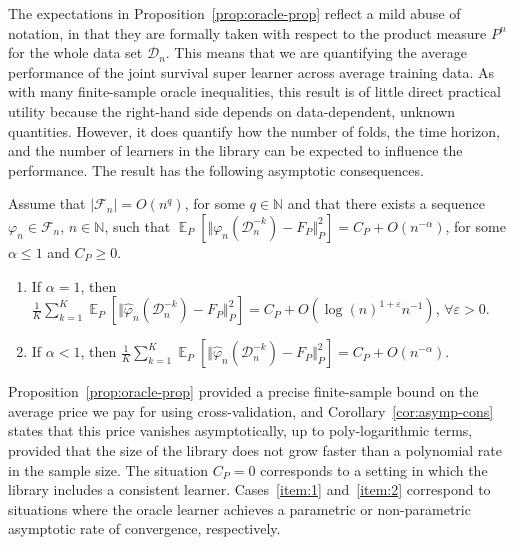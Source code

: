 \documentclass[lineno]{biometrika}
\DeclareMathOperator{\E}{\mathbb{E}} %
\newcommand{\N}{\mathbb{N}}
\renewcommand{\phi}{\varphi}
\renewcommand{\epsilon}{\varepsilon}
\newcommand\bigO{\textit{O}}
\newcommand{\1}{\mathds{1}}
\newcommand{\data}{\ensuremath{\mathcal{D}}}
\begin{document}
The expectations in Proposition~\ref{prop:oracle-prop} reflect a mild
abuse of notation, in that they are formally taken with respect to the
product measure \( P^{n} \) for the whole data set \( \data_n \). This
means that we are quantifying the average performance of the joint
survival super learner across average training data. As with many
finite-sample oracle inequalities, this result is of little direct
practical utility because the right-hand side depends on
data-dependent, unknown quantities. However, it does quantify how the
number of folds, the time horizon, and the number of learners in the
library can be expected to influence the performance. The result has
the following asymptotic consequences.

\begin{corollary}
  \label{cor:asymp-cons}
  Assume that \( |\mathcal{F}_n| = \bigO(n^q)\), for some
  \( q \in \N \) and that there exists a sequence
  \( \phi_n \in \mathcal{F}_n \), \( n \in \N \), such that
  \(  \E_{P}{\left[ \Vert
      \phi_n(\data_n^{-k}) - F_P \Vert_{P}^2 \right]} = C_P +
  \bigO(n^{-\alpha}) \), for some \( \alpha\leq 1 \) and
  \( C_P \geq 0 \).
  \begin{enumerate}[label=(\alph*)]
  \item\label{item:1} If $\alpha=1$, then
    \(\frac{1}{K}\sum_{k=1}^{K} \E_{P}{\left[ \Vert
        \hat{\phi}_n(\data_n^{-k}) - F_P \Vert_{P}^2 \right]} = C_P +
    \bigO(\log(n)^{1+\epsilon}n^{-1}) \), $\forall\epsilon>0$.
  \item\label{item:2} If $\alpha<1$, then
    \(\frac{1}{K}\sum_{k=1}^{K} \E_{P}{\left[ \Vert
        \hat{\phi}_n(\data_n^{-k}) - F_P \Vert_{P}^2 \right]} = C_P +
    \bigO(n^{-\alpha}) \).
  \end{enumerate}
\end{corollary}

Proposition~\ref{prop:oracle-prop} provided a precise finite-sample
bound on the average price we pay for using cross-validation, and
Corollary~\ref{cor:asymp-cons} states that this price vanishes
asymptotically, up to poly-logarithmic terms, provided that the size
of the library does not grow faster than a polynomial rate in the
sample size. The situation \( C_P=0 \) corresponds to a setting in
which the library includes a consistent learner. Cases~\ref{item:1}
and~\ref{item:2} correspond to situations where the oracle learner
achieves a parametric or non-parametric asymptotic rate of
convergence, respectively.
\end{document}
